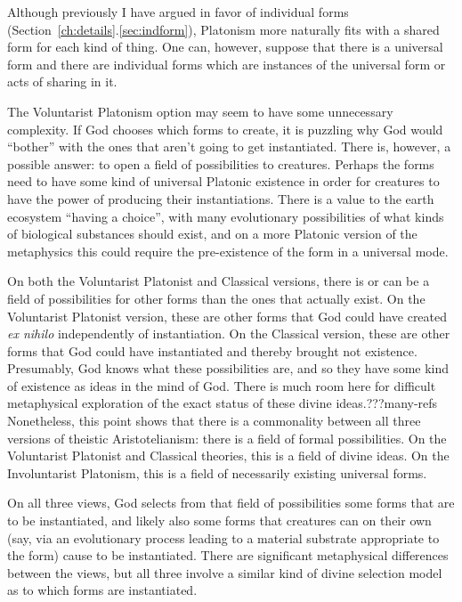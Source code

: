 Although previously I have argued in favor of individual forms (Section~\ref{ch:details}.\ref{sec:indform}), Platonism more
naturally fits with a shared form for each kind of thing. One can, however, suppose that there is a universal form
and there are individual forms which are instances of the universal form or acts of sharing in it.

The Voluntarist Platonism option may seem to have some unnecessary complexity. If God chooses which forms to create, it is 
puzzling why God would ``bother'' with the ones that aren't going to get instantiated. There is, however, a possible answer:
to open a field of possibilities to creatures. Perhaps the forms need to have some kind of universal Platonic existence in order for
creatures to have the power of producing their instantiations. There is a value to the earth ecosystem ``having a choice'', with
many evolutionary possibilities of what kinds of biological substances should exist, and on a more Platonic version of the 
metaphysics this could require the pre-existence of the form in a universal mode. 

On both the Voluntarist Platonist and Classical versions, there is or can be a field of possibilities for other forms than 
the ones that actually exist. On the Voluntarist Platonist version, these are other forms that God could have created
\textit{ex nihilo} independently of instantiation.  On the Classical version, these are other forms that God could have 
instantiated and thereby brought not existence. Presumably, God knows what these possibilities are, and so they have some 
kind of existence as ideas in the mind of God. There is much room here for difficult metaphysical exploration of the 
exact status of these divine ideas.???many-refs Nonetheless, this point shows that there is a commonality between all three
versions of theistic Aristotelianism: there is a field of formal possibilities. On the Voluntarist Platonist and Classical
theories, this is a field of divine ideas. On the Involuntarist Platonism, this is a field of necessarily existing 
universal forms.

On all three views, God selects from that field of possibilities some forms that are to be instantiated, and likely also some  forms that creatures can on their own (say, via an evolutionary process leading to a material substrate
appropriate to the form) cause to be instantiated. There are significant metaphysical differences between the
views, but all three involve a similar kind of divine selection model as to which forms are instantiated.

